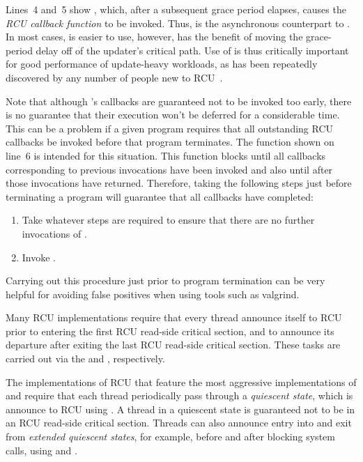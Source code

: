 \documentclass[letterpaper,twocolumn,10pt]{article}
\begin{document}
Lines~4 and~5 show , which, after a subsequent grace period
elapses, causes the  \emph{RCU callback function} to be invoked.
Thus,  is the asynchronous counterpart to
.
In most cases,  is easier to use, however, 
has the benefit of moving the grace-period delay off of the updater's
critical path.
Use of  is thus critically important for good performance of
update-heavy workloads, as has been repeatedly discovered by any number of
people new to RCU~\cite{PaulEMcKenney2015ReadMostly}.

Note that although 's callbacks are guaranteed not to be
invoked too early, there is no guarantee that their execution won't be
deferred for a considerable time.
This can be a problem if a given program requires that all outstanding
RCU callbacks be invoked before that program terminates.
The  function shown on line~6 is intended for this
situation.
This function blocks until all callbacks corresponding to previous
 invocations have been invoked and also until after
those invocations have returned.
Therefore, taking the following steps just before terminating a program
will guarantee that all callbacks have completed:

\begin{enumerate}
\item	Take whatever steps are required to ensure that there are no
	further invocations of .
\item	Invoke .
\end{enumerate}

Carrying out this procedure just prior to program termination can be very
helpful for avoiding false positives when using tools such as valgrind.

Many RCU implementations require that every thread announce itself to
RCU prior to entering the first RCU read-side critical section, and
to announce its departure after exiting the last RCU read-side
critical section.
These tasks are carried out via the  and
, respectively.

The implementations of RCU that feature the most aggressive implementations of
 and  require that each thread
periodically pass through a \emph{quiescent state}, which is announce to RCU
using .
A thread in a quiescent state is guaranteed not to be in an RCU
read-side critical section.
Threads can also announce entry into and exit from \emph{extended
quiescent states}, for example, before and after blocking system
calls, using  and .
\end{document}
